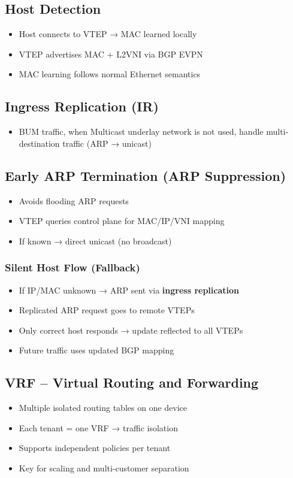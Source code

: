 \begin{multicols*}{5}
		\subsection{Host Detection}
		\begin{itemize}
			\item Host connects to VTEP → MAC learned locally
			\item VTEP advertises MAC + L2VNI via BGP EVPN
			\item MAC learning follows normal Ethernet semantics
		\end{itemize}
		
		\subsection{Ingress Replication (IR)}
		\begin{itemize}
			\item BUM traffic, when Multicast underlay network is not used, handle multi-destination traffic (ARP → unicast)
		\end{itemize}
		
		\subsection{Early ARP Termination (ARP Suppression)}
		\begin{itemize}
			\item Avoids flooding ARP requests
			\item VTEP queries control plane for MAC/IP/VNI mapping
			\item If known → direct unicast (no broadcast)
		\end{itemize}
		
		\subsubsection{Silent Host Flow (Fallback)}
		\begin{itemize}
			\item If IP/MAC unknown → ARP sent via \textbf{ingress replication}
			\item Replicated ARP request goes to remote VTEPs
			\item Only correct host responds → update reflected to all VTEPs
			\item Future traffic uses updated BGP mapping
		\end{itemize}
		
		\subsection{VRF – Virtual Routing and Forwarding}
		\begin{itemize}
			\item Multiple isolated routing tables on one device
			\item Each tenant = one VRF → traffic isolation
			\item Supports independent policies per tenant
			\item Key for scaling and multi-customer separation
		\end{itemize}
		

\end{multicols*}

